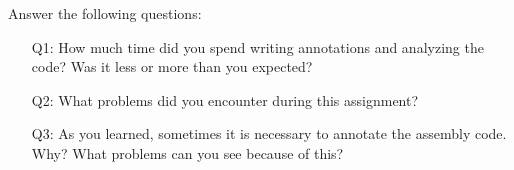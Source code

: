 \label{problem:6}

Answer the following questions:

\begin{itemize}

\item[Q1:]
  How much time did you spend writing annotations and analyzing the code?
  Was it less or more than you expected?

\item[Q2:]
  What problems did you encounter during this assignment?

\item[Q3:]
  As you learned, sometimes it is necessary to annotate the assembly code.
  Why? What problems can you see because of this?

\end{itemize}
